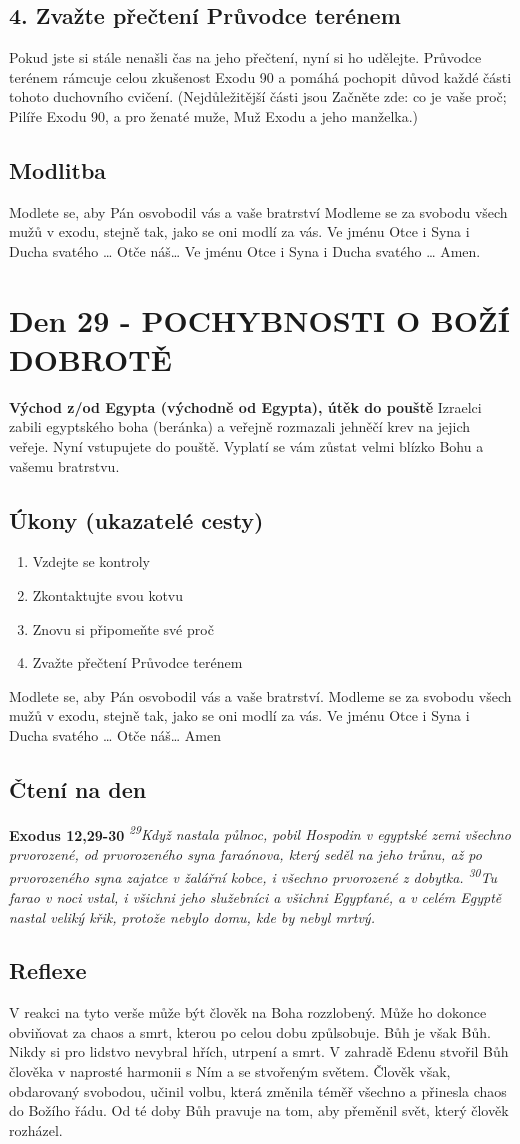 \documentclass[11pt]{article}
\newcommand{\zacatekPatyTyden}{
  \textbf{Východ z/od Egypta (východně od Egypta), útěk do pouště} \newline
  Izraelci zabili egyptského boha (beránka) a veřejně rozmazali jehněčí krev na jejich veřeje. Nyní vstupujete
  do pouště. Vyplatí se vám zůstat velmi blízko Bohu a vašemu bratrstvu.

\subsection*{Úkony (ukazatelé cesty)}
\begin{enumerate}
  \item Vzdejte se kontroly
  \item Zkontaktujte svou kotvu
  \item Znovu si připomeňte své proč
  \item Zvažte přečtení Průvodce terénem
\end{enumerate}
Modlete se, aby Pán osvobodil vás a vaše bratrství. \newline
Modleme se za svobodu všech mužů v exodu, stejně tak, jako se oni modlí za vás.\newline
Ve jménu Otce i Syna i Ducha svatého …  Otče náš… Amen
}
\begin{document}
\subsection*{4. Zvažte přečtení Průvodce terénem}
Pokud jste si stále nenašli čas na jeho přečtení, nyní si ho udělejte. Průvodce terénem rámcuje celou zkušenost Exodu 90 a pomáhá pochopit důvod každé části tohoto duchovního cvičení. (Nejdůležitější části jsou Začněte zde: co je vaše proč; Pilíře Exodu 90, a pro ženaté muže, Muž Exodu a jeho manželka.)

\subsection*{Modlitba}
Modlete se, aby Pán osvobodil vás a vaše bratrství \newline
Modleme se za svobodu všech mužů v exodu, stejně tak, jako se oni modlí za vás.\newline
Ve jménu Otce i Syna i Ducha svatého … Otče náš… Ve jménu Otce i Syna i Ducha svatého … Amen.
\newpage

\newpage
\section{Den 29 - POCHYBNOSTI O BOŽÍ DOBROTĚ}
\zacatekPatyTyden
\subsection*{Čtení na den}
\textbf{Exodus 12,29-30}
\newline
\textit{
\textsuperscript{29}Když nastala půlnoc, pobil Hospodin v egyptské zemi všechno prvorozené, od prvorozeného syna faraónova, který seděl na jeho trůnu, až po prvorozeného syna zajatce v žalářní kobce, i všechno prvorozené z dobytka.
\textsuperscript{30}Tu farao v noci vstal, i všichni jeho služebníci a všichni Egypťané, a v celém Egyptě nastal veliký křik, protože nebylo domu, kde by nebyl mrtvý.
}

\subsection*{Reflexe}

V reakci na tyto verše může být člověk na Boha rozzlobený. Může ho dokonce obviňovat za chaos a smrt,
kterou po celou dobu způlsobuje. Bůh je však Bůh. Nikdy si pro lidstvo nevybral hřích, utrpení a smrt.
V zahradě Edenu stvořil Bůh člověka v naprosté harmonii s Ním a se stvořeným světem. Člověk však,
obdarovaný svobodou, učinil volbu, která změnila téměř všechno a přinesla chaos do Božího řádu. Od té
doby Bůh pravuje na tom, aby přeměnil svět, který člověk rozházel.
\end{document}
